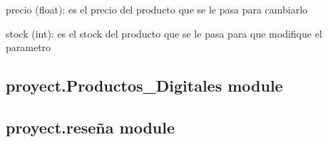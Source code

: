 \documentclass[letterpaper,10pt,spanish]{sphinxmanual}
\begin{document}
\begin{fulllineitems}
\begin{fulllineitems}
\begin{description}
\end{description}

\end{fulllineitems}


\begin{fulllineitems}
\label{\detokenize{proyect:proyect.Productos.Productos.set_precio}}
\pysigstartsignatures
{}
\pysigstopsignatures\begin{description}
\sphinxAtStartPar
precio (float): es el precio del producto que se le pasa para cambiarlo

\end{description}

\end{fulllineitems}


\begin{fulllineitems}
\label{\detokenize{proyect:proyect.Productos.Productos.set_stock}}
\pysigstartsignatures
{}
\pysigstopsignatures\begin{description}
\sphinxAtStartPar
stock (int): es el stock del producto que se le pasa para que modifique el parametro

\end{description}

\end{fulllineitems}


\end{fulllineitems}



\subsection{proyect.Productos\_Digitales module}
\label{\detokenize{proyect:proyect-productos-digitales-module}}

\subsection{proyect.reseña module}
\label{\detokenize{proyect:proyect-resena-module}}
\end{document}
